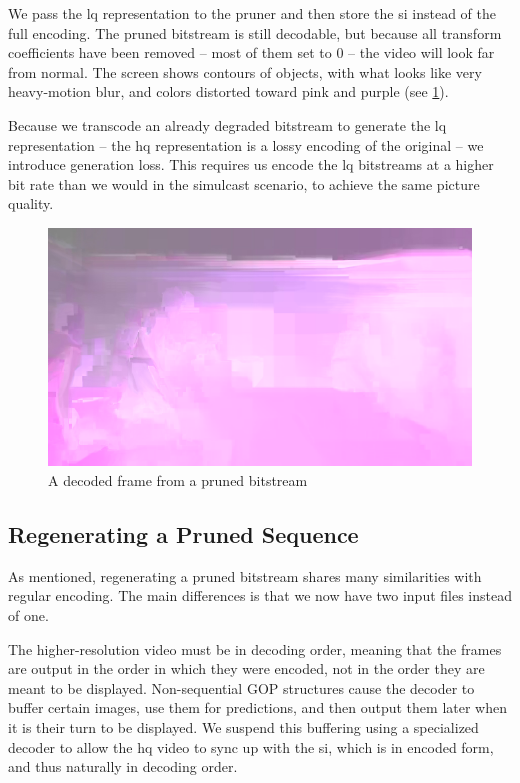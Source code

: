 We pass the \gls{lq} representation to the pruner and then store the \gls{si} instead of the full encoding. The pruned bitstream is still decodable, but because all transform coefficients have been removed -- most of them set to 0 -- the video will look far from normal. The screen shows contours of objects, with what looks like very heavy-motion blur, and colors distorted toward pink and purple (see \cref{fig:pruned-frame}).

Because we transcode an already degraded bitstream to generate the \gls{lq} representation -- the \gls{hq} representation is a lossy encoding of the original -- we introduce generation loss. This requires us encode the \gls{lq} bitstreams at a higher bit rate than we would in the simulcast scenario, to achieve the same picture quality.

\begin{figure}
    \centering
    \includegraphics[scale=0.5]{pictures/yuv-player-captures/basketball_drive_fp_640x360_50_dec_38}
    \caption{A decoded frame from a pruned bitstream}
    \label{fig:pruned-frame}
\end{figure}

\subsection{Regenerating a Pruned Sequence}

As mentioned, regenerating a pruned bitstream shares many similarities with regular encoding. The main differences is that we now have two input files instead of one.

The higher-resolution video must be in decoding order, meaning that the frames are output in the order in which they were encoded, not in the order they are meant to be displayed. Non-sequential GOP structures cause the decoder to buffer certain images, use them for predictions, and then output them later when it is their turn to be displayed. We suspend this buffering using a specialized decoder to allow the \gls{hq} video to sync up with the \gls{si}, which is in encoded form, and thus naturally in decoding order.

